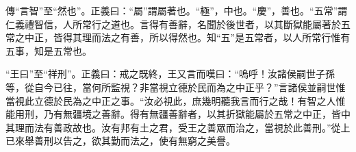 {\noindent\zhuan{}\fzbyks 傳“言智”至“然也”。正義曰：“屬”謂屬著也。“極”，中也。“慶”，善也。“五常”謂仁義禮智信，人所常行之道也。言得有善辭，名聞於後世者，以其斷獄能屬著於五常之中正，皆得其理而法之有善，所以得然也。知“五”是五常者，以人所常行惟有五事，知是五常也。 \par}

{\noindent\shu{}\fzkt “王曰”至“祥刑”。正義曰：戒之既終，王又言而嘆曰：“嗚呼！汝諸侯嗣世子孫等，從自今已往，當何所監視？非當視立德於民而為之中正乎？”言諸侯並嗣世惟當視此立德於民為之中正之事。“汝必視此，庶幾明聽我言而行之哉！有智之人惟能用刑，乃有無疆境之善辭。得有無疆善辭者，以其折獄能屬於五常之中正，皆中其理而法有善政故也。汝有邦有土之君，受王之善眾而治之，當視於此善刑。”從上已來舉善刑以告之，欲其勤而法之，使有無窮之美譽。 \par}

